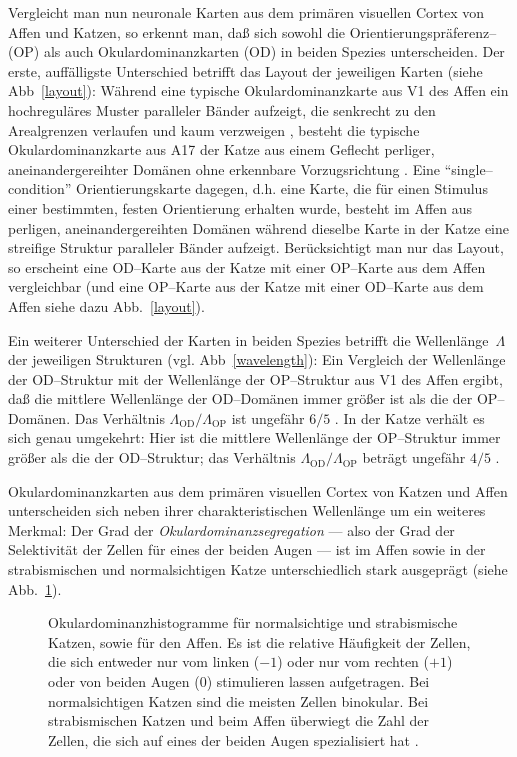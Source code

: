Vergleicht man nun neuronale Karten aus dem primären visuellen Cortex von
Affen und Katzen, so erkennt man, daß sich sowohl die
Orientierungspräferenz-- (OP) als auch Okulardominanzkarten (OD) in beiden
Spezies unterscheiden. Der erste, auffälligste Unterschied betrifft das
Layout der jeweiligen Karten (siehe Abb~\ref{layout}): Während eine
typische Okulardominanzkarte aus V1 des Affen ein hochreguläres Muster
paralleler Bänder aufzeigt, die senkrecht zu den Arealgrenzen verlaufen
und kaum verzweigen \cite{levayetal:1985,grinvald:1991}, besteht die
typische Okulardominanzkarte aus A17 der Katze aus einem Geflecht perliger,
aneinandergereihter Domänen ohne erkennbare Vorzugsrichtung
\cite{andersonetal:1988,loewel:1987}. Eine ``single--condition''
Orientierungskarte dagegen, d.h. eine Karte, die für einen Stimulus einer
bestimmten, festen Orientierung erhalten wurde, besteht im Affen aus
perligen, aneinandergereihten Domänen während dieselbe Karte in der Katze
eine streifige Struktur paralleler Bänder aufzeigt. Berücksichtigt man
nur das Layout, so erscheint eine OD--Karte aus der Katze mit einer
OP--Karte aus dem Affen vergleichbar (und eine OP--Karte aus der Katze mit
einer OD--Karte aus dem Affen siehe dazu Abb.~\ref{layout}).

Ein weiterer Unterschied der Karten in beiden Spezies betrifft die
Wellenlänge~$\Lambda$ der jeweiligen Strukturen
(vgl. Abb~\ref{wavelength}): Ein Vergleich der Wellenlänge der
OD--Struktur mit der Wellenlänge der OP--Struktur aus V1 des Affen ergibt,
daß die mittlere Wellenlänge der OD--Domänen immer größer ist als die
der OP--Domänen. Das Verhältnis
$\Lambda_{\text{OD}}/\Lambda_{\text{OP}}$ ist ungefähr $6/5$
\cite{oby:1993b}. In der Katze verhält es sich genau umgekehrt: Hier ist
die mittlere Wellenlänge der OP--Struktur immer größer als die der
OD--Struktur; das Verhältnis $\Lambda_{\text{OD}}/\Lambda_{\text{OP}}$
beträgt ungefähr $4/5$ \cite{loewel:1988}.

Okulardominanzkarten aus dem primären visuellen Cortex von Katzen und
Affen unterscheiden sich neben ihrer charakteristischen Wellenlänge um ein
weiteres Merkmal: Der Grad der \emph{Okulardominanzsegregation} --- also
der Grad der Selektivität der Zellen für eines der beiden Augen --- ist
im Affen sowie in der strabismischen und normalsichtigen Katze
unterschiedlich stark ausgeprägt (siehe Abb.~\ref{okuhist}).

\begin{figure}[t]
    \centering
    \caption{Okulardominanzhistogramme für normalsichtige und strabismische
    Katzen, sowie für den Affen. Es ist die relative Häufigkeit der Zellen,
    die sich entweder nur vom linken ($-1$) oder nur vom rechten ($+1$) oder
    von beiden Augen ($0$) stimulieren lassen aufgetragen. Bei normalsichtigen
    Katzen sind die meisten Zellen binokular. Bei strabismischen Katzen und
    beim Affen überwiegt die Zahl der Zellen, die sich auf eines der beiden
    Augen spezialisiert hat \parencite[Daten aus][]{hubel:1989}.}
    \label{okuhist}
\end{figure}

